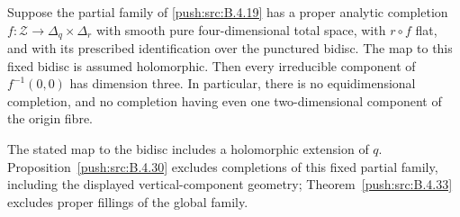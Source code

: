 \begin{proposition}\hypertarget{tag-030V}{}\label{push:src:B.4.26}
\label{push:B426}

Suppose the partial family of \ref{push:src:B.4.19} has a
proper analytic completion $f:\mathcal Z\to\Delta_q\times\Delta_r$
with smooth pure four-dimensional total space, with
$r\circ f$ flat, and with its prescribed identification
over the punctured bidisc. The map to this fixed bidisc
is assumed holomorphic. Then every irreducible component
of $f^{-1}(0,0)$ has dimension three. In particular,
there is no equidimensional completion, and no completion
having even one two-dimensional component of the origin
fibre.

The stated map to the bidisc includes a holomorphic extension of
$q$. Proposition~\ref{push:src:B.4.30} excludes completions of this fixed
partial family, including the displayed vertical-component geometry;
Theorem~\ref{push:src:B.4.33} excludes proper fillings of the global family.
\end{proposition}



